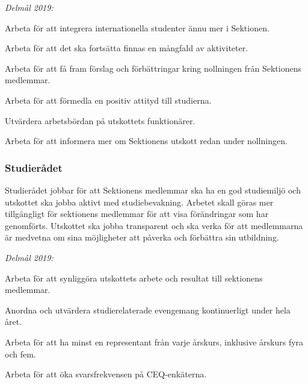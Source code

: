 \documentclass[10pt]{article}
\begin{document}
    \emph{Delmål 2019:}
    \begin{dashlist}
        \item Arbeta för att integrera internationella studenter ännu mer i Sektionen.
        \item Arbeta för att det ska fortsätta finnas en mångfald av aktiviteter.
        \item Arbeta för att få fram förslag och förbättringar kring nollningen från Sektionens medlemmar.
        \item Arbeta för att förmedla en positiv attityd till studierna.
        \item Utvärdera arbetsbördan på utskottets funktionärer.
        \item Arbeta för att informera mer om Sektionens utskott redan under nollningen.        
    \end{dashlist}
    
    \subsubsection*{Studierådet}
    Studierådet jobbar för att Sektionens medlemmar ska ha en god studiemiljö och utskottet ska jobba aktivt med studiebevakning. Arbetet skall göras mer tillgängligt för sektionens medlemmar för att visa förändringar som har genomförts. Utskottet ska jobba transparent och ska verka för att medlemmarna är medvetna om sina möjligheter att påverka och förbättra sin utbildning. 
    
    \emph{Delmål 2019:}
    \begin{dashlist}
        \item Arbeta för att synliggöra utskottets arbete och resultat till sektionens medlemmar. 
        \item Anordna och utvärdera studierelaterade evengemang kontinuerligt under hela året.
        \item Arbeta för att ha minst en representant från varje årskurs, inklusive årskurs fyra och fem. 
        \item Arbeta för att öka svarsfrekvensen på CEQ-enkäterna.        
    \end{dashlist}
    
    \newpage
    
\end{document}
